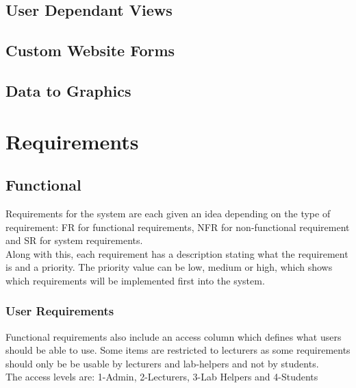 \documentclass[12pt]{article}  %
\theoremstyle{definition}
\theoremstyle{remark}
\begin{document}
\subsection{User Dependant Views}


\subsection{Custom Website Forms}


\subsection{Data to Graphics}






\newpage
\section{Requirements}
 


\subsection{Functional}
Requirements for the system are each given an idea depending on the type of requirement: FR for functional requirements, NFR for non-functional requirement and SR for system requirements.\\
Along with this, each requirement has a description stating what the requirement is and a priority. The priority value can be low, medium or high, which shows which requirements will be implemented first into the system.


\def\arraystretch{1.5}
\subsubsection{User Requirements}
Functional requirements also include an access column which defines what users should be able to use. Some items are restricted to lecturers as some requirements should only be be usable by lecturers and lab-helpers and not by students.\\
The access levels are: 1-Admin, 2-Lecturers, 3-Lab Helpers and 4-Students
\end{document}
